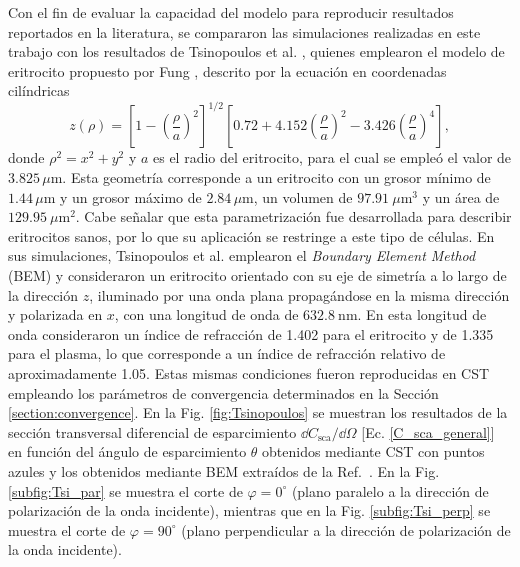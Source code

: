 Con el fin de evaluar la capacidad del modelo para reproducir resultados reportados en la literatura, se compararon las simulaciones realizadas en este trabajo con los resultados de Tsinopoulos et al. \cite{tsinopoulosLightScatteringAggregated2002}, quienes emplearon el modelo de eritrocito propuesto por Fung \cite{fungBiomechanicsMechanicalProperties1990}, descrito por la ecuación en coordenadas cilíndricas
%
\begin{equation}
	z(\rho)=\left[1-\left(\dfrac{\rho}{a}\right)^2\right]^{1/2}\left[0.72+4.152\left(\dfrac{\rho}{a}\right)^2-3.426\left(\dfrac{\rho}{a}\right)^4\right],
	\label{eq:Tsang_eri}
\end{equation}
%
donde $\rho^2=x^2+y^2$ y $a$ es el radio del eritrocito, para el cual se empleó el valor de $3.825\,\mu$m. Esta geometría corresponde a un eritrocito con un grosor mínimo de $1.44\,\mu$m y un grosor máximo de $2.84\,\mu$m, un volumen de $97.91~\mu\text{m}^3$ y un área de $129.95~\mu\text{m}^2$. Cabe señalar que esta parametrización fue desarrollada para describir eritrocitos sanos, por lo que su aplicación se restringe a este tipo de células. En sus simulaciones, Tsinopoulos et al. emplearon el \textit{Boundary Element Method} (BEM)
y consideraron un eritrocito orientado con su eje de simetría a lo largo de la dirección $z$, iluminado por una onda plana propagándose en la misma dirección y polarizada en $x$, con una longitud de onda de $632.8~\text{nm}$. En esta longitud de onda consideraron un índice de refracción de 1.402 para el eritrocito y de 1.335 para el plasma, lo que corresponde a un índice de refracción relativo de aproximadamente 1.05. Estas mismas condiciones fueron reproducidas en CST empleando los parámetros de convergencia determinados en la Sección \ref{section:convergence}. En la Fig. \ref{fig:Tsinopoulos} se muestran los resultados de la sección transversal diferencial de esparcimiento $\dd{C_{\text{sca}}/\dd{\Omega}}$ [Ec. \eqref{C_sca_general}] en función del ángulo de esparcimiento $\theta$  obtenidos mediante CST con puntos azules y los obtenidos mediante BEM extraídos de la Ref.~\cite{tsinopoulosLightScatteringAggregated2002}. En la Fig. \ref{subfig:Tsi_par} se muestra el corte de $\varphi=0^{\circ}$ (plano paralelo a la dirección de polarización de la onda incidente), mientras que en la Fig. \ref{subfig:Tsi_perp} se muestra el corte de $\varphi=90^{\circ}$ (plano perpendicular a la dirección de polarización de la onda incidente). %
%
